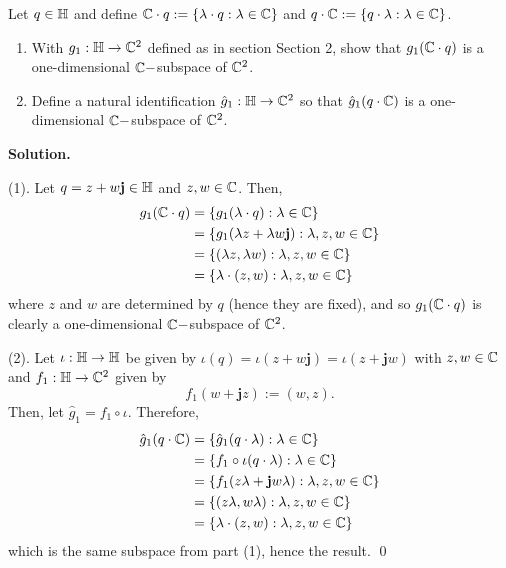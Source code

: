 \documentclass[12pt]{book}
\theoremstyle{definition}
\newenvironment{solution}
{%
  \par\noindent\textbf{Solution.}\quad
}
{%
  \qed\par
}
\begin{document}
\begin{taggedexercise}[\textcolor{red}{TODO}]
  
\end{taggedexercise}

\begin{taggedexercise}[\textcolor{red}{TODO}]
  Let $q \in \mathbb{H}$ and define $\mathbb{C} \cdot q := \{\lambda \cdot q : \lambda \in \mathbb{C}\}$ and $q \cdot \mathbb{C} := \{q \cdot \lambda : \lambda \in \mathbb{C}\}$.
  \begin{enumerate}
    \item With $g_1: \mathbb{H} \to \mathbb{C}^2$ defined as in section Section 2, show that $g_1(\mathbb{C} \cdot q)$ is a one-dimensional $\mathbb{C}-$subspace of $\mathbb{C}^2$.
    \item Define a natural identification $\hat{g}_1 : \mathbb{H} \to \mathbb{C}^2$ so that $\hat{g}_1(q\cdot\mathbb{C})$ is a one-dimensional $\mathbb{C}-$subspace of $\mathbb{C}^2$.
  \end{enumerate}
\end{taggedexercise}

\begin{solution}
  (1). Let $q = z+w\mathbf{j} \in \mathbb{H}$ and $z,w \in \mathbb{C}$.
  Then,
  \[\begin{aligned}
    g_1(\mathbb{C} \cdot q) &= \{g_1(\lambda \cdot q) : \lambda \in \mathbb{C}\} \\
                    &= \{g_1(\lambda z + \lambda w \mathbf{j}): \lambda, z, w \in \mathbb{C}\} \\
                    &= \{(\lambda z, \lambda w ): \lambda, z, w \in \mathbb{C}\} \\
                    &= \{\lambda \cdot (z, w): \lambda, z, w \in \mathbb{C}\}
  \end{aligned}\]
  where $z$ and $w$ are determined by $q$ (hence they are fixed), and so $g_1(\mathbb{C} \cdot q)$ is clearly a one-dimensional $\mathbb{C}-$subspace of $\mathbb{C}^2$.

  (2). Let $\iota: \mathbb{H} \to \mathbb{H}$ be given by $\iota(q) = \iota(z + w\mathbf{j}) = \iota(z + \mathbf{j}w)$ with $z,w \in \mathbb{C}$ and $f_1 : \mathbb{H} \to \mathbb{C}^2$ given by
  \[f_1(w+\mathbf{j}z):= (w, z).\]
  Then, let $\hat{g}_1 = f_1 \circ \iota$.
  Therefore,
  \[\begin{aligned}
    \hat{g}_1(q \cdot \mathbb{C}) &= \{\hat{g}_1(q \cdot \lambda) : \lambda \in \mathbb{C}\} \\
                          &= \{f_1 \circ \iota(q \cdot \lambda) : \lambda \in \mathbb{C}\} \\
                          &= \{f_1(z\lambda + \mathbf{j}w\lambda): \lambda, z, w \in \mathbb{C}\} \\
                          &= \{(z\lambda, w\lambda): \lambda, z, w \in \mathbb{C}\} \\
                          &= \{\lambda \cdot (z, w): \lambda, z, w \in \mathbb{C}\} 
  \end{aligned}\]
  which is the same subspace from part (1), hence the result.
\end{solution}
\end{document}
